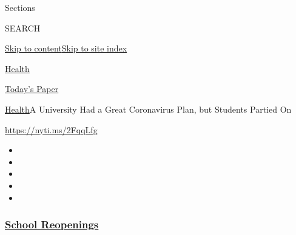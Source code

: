 Sections

SEARCH

\protect\hyperlink{site-content}{Skip to
content}\protect\hyperlink{site-index}{Skip to site index}

\href{https://www.nytimes3xbfgragh.onion/section/health}{Health}

\href{https://myaccount.nytimes3xbfgragh.onion/auth/login?response_type=cookie\&client_id=vi}{}

\href{https://www.nytimes3xbfgragh.onion/section/todayspaper}{Today's
Paper}

\href{/section/health}{Health}\textbar{}A University Had a Great
Coronavirus Plan, but Students Partied On

\url{https://nyti.ms/2FqqLfg}

\begin{itemize}
\item
\item
\item
\item
\item
\end{itemize}

\hypertarget{school-reopenings}{%
\subsubsection{\texorpdfstring{\href{https://www.nytimes3xbfgragh.onion/spotlight/schools-reopening?name=styln-coronavirus-schools-reopening\&region=TOP_BANNER\&block=storyline_menu_recirc\&action=click\&pgtype=Article\&impression_id=82c9b0b0-f4b7-11ea-b564-bd1dfc5ec362\&variant=undefined}{School
Reopenings}}{School Reopenings}}\label{school-reopenings}}

